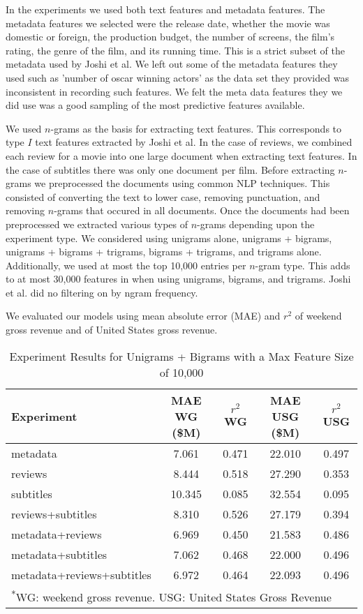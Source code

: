 \documentclass[11pt]{article}
\begin{document}
In the experiments we used both text features and metadata features. The metadata features
we selected were the release date, whether the movie was domestic or foreign, the production
budget, the number of screens, the film's rating, the genre of the film, and its running
time. This is a strict subset of the metadata used by Joshi et al. We left out some of the
metadata features they used such as 'number of oscar winning actors' as the data set they
provided was inconsistent in recording such features. We felt the meta data features they
we did use was a good sampling of the most predictive features available.

We used $n$-grams as the basis for extracting text features. This corresponds to type
$I$ text features extracted by Joshi et al. In the case of reviews, we combined
each review for a movie into one large document when extracting text features. In the
case of subtitles there was only one document per film. Before extracting $n$-grams we
preprocessed the documents using common NLP techniques. This consisted of converting
the text to lower case, removing punctuation, and removing $n$-grams that occured in all documents. 
Once the documents
had been preprocessed we extracted various types of $n$-grams depending upon the
experiment type. We considered using unigrams alone, unigrams + bigrams, unigrams +
bigrams + trigrams, bigrams + trigrams, and trigrams alone. Additionally, we used at most
the top 10,000 entries per $n$-gram type. This adds to at most 30,000 features in when using
unigrams, bigrams, and trigrams. Joshi et al. did no filtering on by ngram frequency.

We evaluated our models using mean absolute error (MAE) and $r^2$ of weekend gross revenue
and of United States gross revenue. 

\begin{table*}[t]
\caption{Experiment Results for Unigrams + Bigrams with a Max Feature Size of 10,000}
\centering
\begin{tabular}{|l c c c c|}
  \hline
  \textbf{Experiment} & \textbf{MAE WG (\$M)} & \textbf{$r^2$ WG} & \textbf{MAE USG (\$M)}
  & \textbf{$r^2$ USG}\\
  \hline
  metadata                    &  7.061 &  0.471  & 22.010  & 0.497\\
  reviews                     &  8.444 &  0.518  & 27.290  & 0.353\\
  subtitles                   & 10.345 &  0.085  & 32.554  & 0.095\\
  reviews+subtitles           &  8.310 &  0.526  & 27.179  & 0.394\\
  metadata+reviews            &  6.969 &  0.450  & 21.583  & 0.486\\
  metadata+subtitles          &  7.062 &  0.468  & 22.000  & 0.496\\
  metadata+reviews+subtitles  &  6.972 &  0.464  & 22.093  & 0.496\\
  \hline
  \multicolumn{5}{l}{\textsuperscript{*}\footnotesize{WG: weekend gross revenue. USG:
  United States Gross Revenue}}
\end{tabular}
\end{table*}
\end{document}
